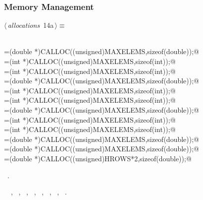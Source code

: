 \documentclass{article}
\begin{document}
\subsubsection{Memory Management}

\begin{flushleft} \small
\begin{minipage}{\linewidth}\label{scrap17}\raggedright\small
{} $\langle\,${\itshape allocations}\nobreak\ {\footnotesize {14a}}$\,\rangle\equiv$
\vspace{-1ex}
\begin{list}{}{} \item
\mbox{}\verb@@\\
\mbox{}\verb@newHmat=(double *)CALLOC((unsigned)MAXELEMS,sizeof(double));@\\
\mbox{}\verb@newHmatj=(int *)CALLOC((unsigned)MAXELEMS,sizeof(int));@\\
\mbox{}\verb@newHmati=(int *)CALLOC((unsigned)MAXELEMS,sizeof(int));@\\
\mbox{}\verb@qmat=(double *)CALLOC((unsigned)MAXELEMS,sizeof(double));@\\
\mbox{}\verb@qmatj=(int *)CALLOC((unsigned)MAXELEMS,sizeof(int));@\\
\mbox{}\verb@qmati=(int *)CALLOC((unsigned)MAXELEMS,sizeof(int));@\\
\mbox{}\verb@bmat=(double *)CALLOC((unsigned)MAXELEMS,sizeof(double));@\\
\mbox{}\verb@bmatj=(int *)CALLOC((unsigned)MAXELEMS,sizeof(int));@\\
\mbox{}\verb@bmati=(int *)CALLOC((unsigned)MAXELEMS,sizeof(int));@\\
\mbox{}\verb@rootr=(double *)CALLOC((unsigned)MAXELEMS,sizeof(double));@\\
\mbox{}\verb@rooti=(double *)CALLOC((unsigned)MAXELEMS,sizeof(double));@\\
\mbox{}\verb@normVec=(double *)CALLOC((unsigned)HROWS*2,sizeof(double));@\\
\mbox{}\verb@@{\NWsep}
\end{list}
\vspace{-1.5ex}
\footnotesize
\begin{list}{}{\setlength{\itemsep}{-\parsep}\setlength{\itemindent}{-\leftmargin}}
\item \NWtxtMacroRefIn\ .
\item \NWtxtIdentsUsed\nobreak\  \verb@newHmat@\nobreak\ , \verb@newHmati@\nobreak\ , \verb@newHmatj@\nobreak\ , \verb@qmat@\nobreak\ , \verb@qmati@\nobreak\ , \verb@qmatj@\nobreak\ , \verb@rooti@\nobreak\ , \verb@rootr@\nobreak\ .

\end{list}
\end{minipage}
\end{flushleft}
\end{document}
